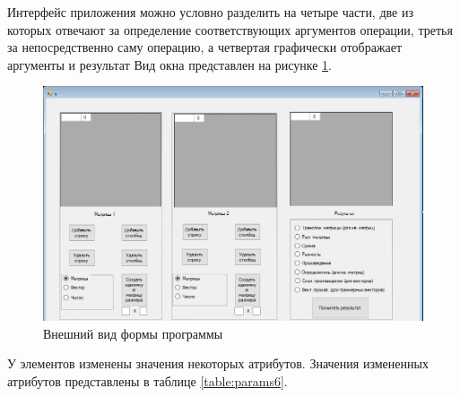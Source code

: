 Интерфейс приложения можно условно разделить на четыре части, две из которых
отвечают за определение соответствующих аргументов операции, третья
за непосредственно саму операцию, а четвертая графически отображает
аргументы и результат
Вид окна представлен на рисунке \ref{fig:task6_form}.
\begin{figure}[H]
    \centering
    \includegraphics[scale=0.7]{task6/form.png}
    \caption{Внешний вид формы программы}
    \label{fig:task6_form}
\end{figure}
У элементов изменены значения некоторых атрибутов. 
Значения измененных атрибутов представлены в таблице \ref{table:params6}.
